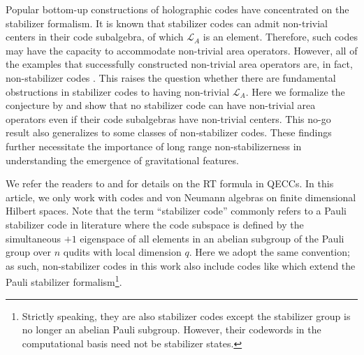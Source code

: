 \documentclass[%
 reprint,
superscriptaddress,
nofootinbib,
 amsmath,amssymb,
 aps,
prx,
floatfix,
]{revtex4-2}
\theoremstyle{definition}
\numberwithin{equation}{section}
\begin{document}
Popular bottom-up constructions of holographic codes\cite{Pastawski:2015qua,Harris:2018jfl,Jahn:2019nmz,Steinberg:2023wll} have concentrated on the stabilizer formalism. It is known \cite{Harlow:2016vwg,Donnelly:2016qqt,Cao:2020ksw,Pollack:2021yij} that stabilizer codes can admit non-trivial centers in their code subalgebra, of which $\mathcal{L}_A$ is an element. Therefore, such codes may have the capacity to accommodate non-trivial area operators. However, all of the examples that successfully constructed non-trivial area operators are, in fact, non-stabilizer codes \cite{Cao:2020ksw,Pollack:2021yij}. This raises the question whether there are fundamental obstructions in stabilizer codes to having non-trivial $\mathcal{L}_A$. Here we formalize the conjecture by \cite{Pollack:2021yij} and show that no stabilizer code can have non-trivial area operators even if their code subalgebras have non-trivial centers. This no-go result also generalizes to some classes of non-stabilizer codes. These findings further necessitate the importance of long range non-stabilizerness\cite{NLmagic,White:2020zoz,Bao:2022mkc,Liu:2020yso} in understanding the emergence of gravitational features. 


We refer the readers to \cite{Harlow:2016vwg} and \cite{Pollack:2021yij} for details on the RT formula in QECCs. In this article, we only work with codes and von Neumann algebras on finite dimensional Hilbert spaces.  Note that the term ``stabilizer code'' commonly refers to a Pauli stabilizer code in literature where the code subspace is defined by the simultaneous $+1$ eigenspace of all elements in an abelian subgroup of the Pauli group over $n$ qudits with local dimension $q$. Here we adopt the same convention; as such, non-stabilizer codes in this work also include codes like \cite{XS,XP} which extend the Pauli stabilizer formalism\footnote{Strictly speaking, they are also stabilizer codes except the stabilizer group is no longer an abelian Pauli subgroup. However, their codewords in the computational basis need not be stabilizer states.}.
\end{document}
